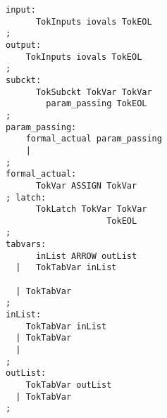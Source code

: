 \begin{minipage}[t]{2in}
\scriptsize
\begin{verbatim}
input:
      TokInputs iovals TokEOL
;
output:
    TokInputs iovals TokEOL
;
subckt:
      TokSubckt TokVar TokVar
        param_passing TokEOL
;
param_passing:
    formal_actual param_passing
    |
;
formal_actual:
      TokVar ASSIGN TokVar
; latch:
      TokLatch TokVar TokVar
                    TokEOL
;
tabvars:
      inList ARROW outList
  |   TokTabVar inList

  | TokTabVar
;
inList:
    TokTabVar inList
  | TokTabVar
  |
;
outList:
    TokTabVar outList
  | TokTabVar
;
\end{verbatim}
\end{minipage}
